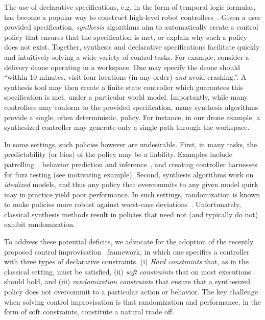 The use of declarative specifications, e.g. in the form of temporal logic formulas, has become a popular way to construct high-level robot controllers~\cite{DBLP:conf/iros/HorowitzWM14, DBLP:conf/rss/WongEK14, DBLP:conf/iros/HeLKV17, DBLP:conf/icra/FuATP16, DBLP:conf/icra/HeWKV19, DBLP:journals/arobots/MoarrefK20, DBLP:conf/icra/KantarosM0P20}.
Given a user provided specification, \emph{synthesis} algorithms aim
to automatically create a control policy that ensures that the
specification is met, or explain why such a policy does not
exist. Together, synthesis and declarative specifications facilitate
quickly and intuitively solving a wide variety of control tasks.  For
example, consider a delivery drone operating in a workspace. One may
specify the drone should ``within 10 minutes, visit four locations (in any
order) \emph{and} avoid crashing.''. A synthesis tool may then create a
finite state controller which guarantees this specification is met,
under a particular world model.
Importantly, while many controllers may conform to the
provided specification, many synthesis algorithms provide a
single, often deterministic, policy.  For instance, in our drone
example, a synthesized controller may generate only a single path
through the workspace.

In some settings, such policies however are undesirable.  First, in
many tasks, the predictability (or bias) of the policy may be a
liability.  Examples include
patrolling~\cite{DBLP:journals/ior/AlpernMP11}, behavior prediction
and inference~\cite{DBLP:conf/cav/Vazquez-Chanlatte20}, and creating
controller harnesses for fuzz testing (see motivating
example). Second, synthesis algorithms work on \emph{idealized}
models, and thus any policy that overcommits to any given model quirk
may in practice yield poor performance. In such settings,
randomization is known to make policies more robust against worst-case
deviations~\cite{mceThesis, maxEntAnswer}. Unfortunately, classical 
synthesis methods result in policies that need not (and typically do
not) exhibit randomization.

To address these potential deficits, we advocate for the adoption of
the recently proposed control
improvisation~\cite{DBLP:conf/cav/FremontS18,DBLP:conf/fsttcs/FremontDSW15}
framework, in which one specifies a controller with three types of
declarative constraints. (i) \emph{Hard constraints} that, as in the
classical setting, must be satisfied, (ii) \emph{soft constraints} that
on most executions should hold, and (iii) \emph{randomization
constraints} that ensure that a synthesized policy does not overcommit to a particular action or behavior. 
The key challenge when solving control improvisation is that randomization and performance, in the form of soft constraints, constitute a natural trade off.

